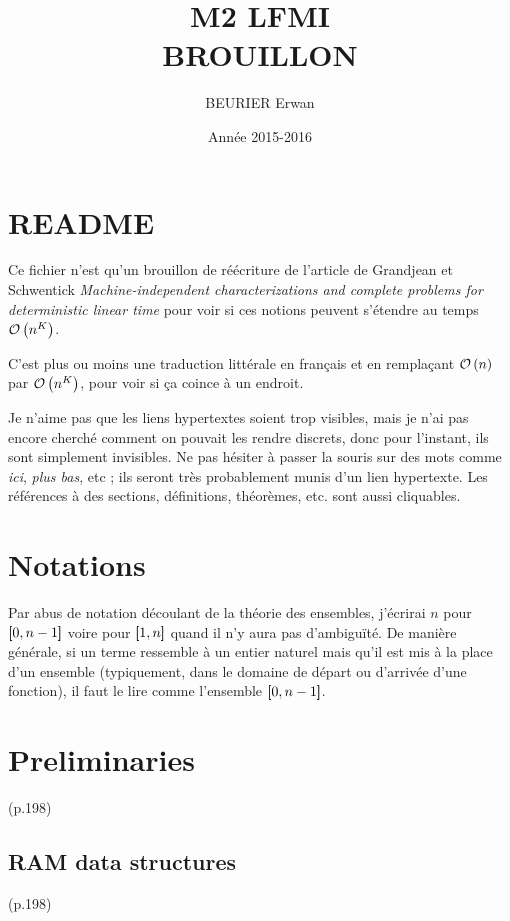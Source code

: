 \documentclass{article}
\author{BEURIER Erwan}
\title{M2 LFMI \\ BROUILLON }
\date{Année 2015-2016}
\begin{document}
	
	
	\section*{README}
		\label{sec:README}
	
	Ce fichier n'est qu'un brouillon de réécriture de l'article de Grandjean et Schwentick \emph{Machine-independent characterizations and complete problems for deterministic linear time} pour voir si ces notions peuvent s'étendre au temps $\mathcal{O}\left( n^K \right)$.
	
	C'est plus ou moins une traduction littérale en français et en remplaçant $\mathcal{O}\left( n \right)$ par $\mathcal{O}\left( n^K \right)$, pour voir si ça coince à un endroit.
	
	Je n'aime pas que les liens hypertextes soient trop visibles, mais je n'ai pas encore cherché comment on pouvait les rendre discrets, donc pour l'instant, ils sont simplement invisibles. Ne pas hésiter à passer la souris sur des mots comme \emph{ici}, \emph{plus bas}, etc ; ils seront très probablement munis d'un lien hypertexte. Les références à des sections, définitions, théorèmes, etc. sont aussi cliquables.
	
	
	\section*{Notations}
		\label{sec:Notations}
	
	
	Par abus de notation découlant de la théorie des ensembles, j'écrirai $n$ pour $\left[\!\!\>\!\left[ 0 , n-1 \right]\!\!\>\!\right]$ voire pour $\left[\!\!\>\!\left[ 1 , n \right]\!\!\>\!\right]$ quand il n'y aura pas d'ambiguïté. De manière générale, si un terme ressemble à un entier naturel mais qu'il est mis à la place d'un ensemble (typiquement, dans le domaine de départ ou d'arrivée d'une fonction), il faut le lire comme l'ensemble $\left[\!\!\>\!\left[ 0 , n-1 \right]\!\!\>\!\right]$.
	
	\pagebreak
	
	\section{Preliminaries} (p.198)
		\label{sec:Preliminaries}
	
		\subsection{RAM data structures} (p.198)
			\label{sec:RAM_data_structures}
\end{document}
